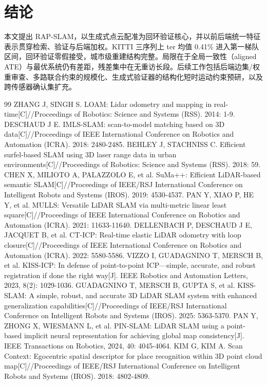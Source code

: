 \documentclass[UTF8,12pt]{ctexart}
\begin{document}
\section{结论}
本文提出 RAP-SLAM，以生成式点云配准为回环验证核心，并以前后端统一特征表示贯穿检索、验证与后端加权。KITTI 三序列上 ter 均值 0.41\% 进入第一梯队区间，回环验证零假接受，城市级重建结构完整。局限在于全局一致性（aligned ATE）与最优系统仍有差距，残差集中在无重访长段。后续工作包括后端边集/权重审查、多路联合约束的规模化、生成式验证器的结构化短时运动约束预研，以及跨传感器确认集扩充。

\begin{thebibliography}{99}
\small
 ZHANG J, SINGH S. LOAM: Lidar odometry and mapping in real-time[C]//Proceedings of Robotics: Science and Systems (RSS). 2014: 1-9.
 DESCHAUD J E. IMLS-SLAM: scan-to-model matching based on 3D data[C]//Proceedings of IEEE International Conference on Robotics and Automation (ICRA). 2018: 2480-2485.
 BEHLEY J, STACHNISS C. Efficient surfel-based SLAM using 3D laser range data in urban environments[C]//Proceedings of Robotics: Science and Systems (RSS). 2018: 59.
 CHEN X, MILIOTO A, PALAZZOLO E, et al. SuMa++: Efficient LiDAR-based semantic SLAM[C]//Proceedings of IEEE/RSJ International Conference on Intelligent Robots and Systems (IROS). 2019: 4530-4537.
 PAN Y, XIAO P, HE Y, et al. MULLS: Versatile LiDAR SLAM via multi-metric linear least square[C]//Proceedings of IEEE International Conference on Robotics and Automation (ICRA). 2021: 11633-11640.
 DELLENBACH P, DESCHAUD J E, JACQUET B, et al. CT-ICP: Real-time elastic LiDAR odometry with loop closure[C]//Proceedings of IEEE International Conference on Robotics and Automation (ICRA). 2022: 5580-5586.
 VIZZO I, GUADAGNINO T, MERSCH B, et al. KISS-ICP: In defense of point-to-point ICP---simple, accurate, and robust registration if done the right way[J]. IEEE Robotics and Automation Letters, 2023, 8(2): 1029-1036.
 GUADAGNINO T, MERSCH B, GUPTA S, et al. KISS-SLAM: A simple, robust, and accurate 3D LiDAR SLAM system with enhanced generalization capabilities[C]//Proceedings of IEEE/RSJ International Conference on Intelligent Robots and Systems (IROS). 2025: 5363-5370.
 PAN Y, ZHONG X, WIESMANN L, et al. PIN-SLAM: LiDAR SLAM using a point-based implicit neural representation for achieving global map consistency[J]. IEEE Transactions on Robotics, 2024, 40: 4045-4064.
 KIM G, KIM A. Scan Context: Egocentric spatial descriptor for place recognition within 3D point cloud map[C]//Proceedings of IEEE/RSJ International Conference on Intelligent Robots and Systems (IROS). 2018: 4802-4809.

\end{thebibliography}
\end{document}
